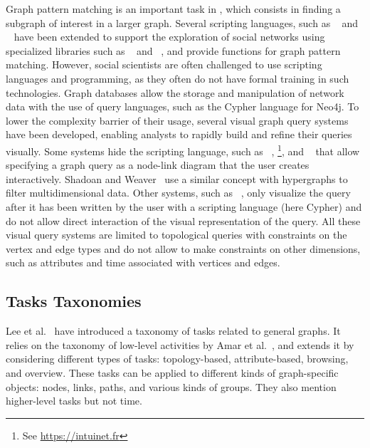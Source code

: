Graph pattern matching is an important task in \sna, which consists in finding a subgraph of interest in a larger graph\cite{fanGraphPatternMatching2012}.
Several scripting languages, such as ~\cite{Rstat} and ~\cite{Python} have been extended to support the exploration of social networks using specialized libraries such as ~\cite{igraph} and ~\cite{networkx}, and provide functions for graph pattern matching.
However, social scientists are often challenged to use scripting languages and programming, as they often do not have formal training in such technologies.
Graph databases allow the storage and manipulation of network data with the use of query languages, such as the Cypher language for Neo4j\cite{neo4j}.
To lower the complexity barrier of their usage, several visual graph query systems have been developed, enabling analysts to rapidly build and refine their queries visually.
Some systems hide the scripting language, such as ~\cite{chauGRAPHITEVisualQuery2008}, \footnote{See \url{https://intuinet.fr}}, and ~\cite{cuencaVERTIGoVisualPlatform2021} that allow specifying a graph query as a node-link diagram that the user creates interactively.
Shadoan and Weaver~\cite{shadoanVisualAnalysisHigherOrder2013} use a similar concept with hypergraphs to filter multidimensional data.
Other systems, such as ~\cite{pientaVIGORInteractiveVisual2018}, only visualize the query after it has been written by the user with a scripting language (here Cypher) and do not allow direct interaction of the visual representation of the query.
All these visual query systems are limited to topological queries with constraints on the vertex and edge types and do not allow to make constraints on other dimensions, such as attributes and time associated with vertices and edges.

\iffalse
\subsection{Tasks Taxonomies}

Lee et al.~\cite{lee:hal-00851754} have introduced a taxonomy of tasks related to general graphs.
It relies on the taxonomy of low-level activities by Amar et al.~\cite{Amar05}, and extends it by considering different types of tasks: topology-based, attribute-based, browsing, and overview. These tasks can be applied to different kinds of graph-specific objects: nodes, links, paths, and various kinds of groups.
They also mention higher-level tasks but not time.

